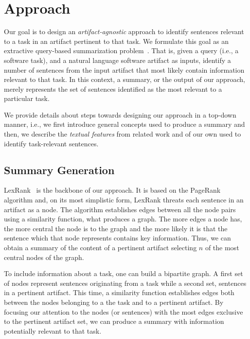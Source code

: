 \section{Approach}
\label{cp5:approaches}


Our goal is to design an \textit{artifact-agnostic} approach
to identify sentences relevant to a task in an artifact pertinent to that task.
We formulate this goal as an extractive query-based summarization problem~\cite{Goldsteinet1999}.
That is, given a query (i.e., a software task),
and a natural language software artifact as inputs,
identify a number of sentences from the input artifact that
most likely contain information relevant to that task. 
In this context, a summary, or the output of our approach, 
merely represents the set of sentences identified as 
the most relevant to a particular task.



We provide details about steps towards designing our approach in a top-down manner, i.e., we first introduce general concepts
used to produce a summary and then, we describe
the \textit{textual features} from related work and of our own used to identify task-relevant sentences.






\subsection{Summary Generation}




LexRank~\cite{Erkan2004} is the backbone of our approach. 
It is based on the PageRank~\cite{Page1999} algorithm
and, on its most simplistic form, LexRank threats each sentence in an artifact as a node.
The algorithm
establishes edges between all the node pairs using a similarity function, what produces a graph. 
The more edges a node has, the more central the node is to the graph and the more likely it is that the sentence which that node represents contains key information. 
 Thus, we can obtain a summary of the content of a pertinent artifact selecting $n$ of the most central nodes of the graph. 


To include information about a task, one can build a bipartite graph.
A first set of nodes represent sentences originating from a task while a second set, sentences in a pertinent artifact.
This time,  a similarity function 
establishes edges both between the nodes belonging to a the task and to a pertinent artifact.
By focusing our attention to the nodes (or sentences) with the most edges 
exclusive to the pertinent artifact set, we can produce a summary with information potentially relevant to that task.



